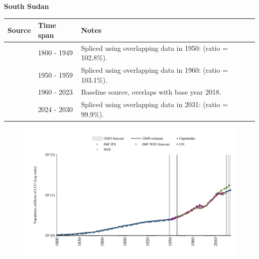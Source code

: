 \documentclass[12pt,a4paper,landscape]{article}
\begin{document}
\begin{adjustbox}{max totalsize={\paperwidth}{\paperheight},center}
\begin{minipage}[t][\textheight][t]{\textwidth}
\vspace*{0.5cm}
{}
\begin{center}
{\Large\bfseries South Sudan}
\end{center}
\vspace{0.5cm}
\begin{table}[H]
\centering
\small
\begin{tabular}{|l|l|l|}
\hline
\textbf{Source} & \textbf{Time span} & \textbf{Notes} \\
\hline
\rowcolor{white}\cite{Gapminder}& 1800 - 1949 &Spliced using overlapping data in 1950: (ratio = 102.8\%).\\
\rowcolor{lightgray}\cite{IMF_IFS}& 1950 - 1959 &Spliced using overlapping data in 1960: (ratio = 103.1\%).\\
\rowcolor{white}\cite{WDI}& 1960 - 2023 &Baseline source, overlaps with base year 2018.\\
\rowcolor{lightgray}\cite{Gapminder}& 2024 - 2030 &Spliced using overlapping data in 2031: (ratio = 99.9\%).\\
\hline
\end{tabular}
\end{table}
\begin{figure}[H]
\centering
\includegraphics[width=\textwidth,height=0.6\textheight,keepaspectratio]{graphs/SSD_pop.pdf}
\end{figure}
\end{minipage}
\end{adjustbox}
\end{document}
